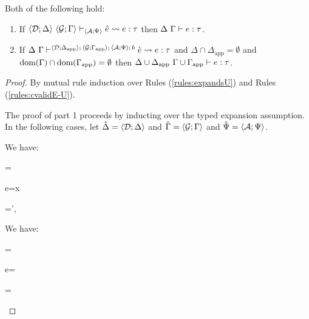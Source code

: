 \begin{theorem}\label{thm:typed-expansion-U} Both of the following hold:
\begin{enumerate}
\item If $\langle \mathcal{D}; \Delta \rangle~\langle \mathcal{G}; \Gamma \rangle \vdash_{\langle \mathcal{A}; \Psi \rangle} {\hat e} \leadsto e : \tau$ then $\Delta~\Gamma \vdash e : \tau$.
\item If $\Delta~\Gamma\vdash^{\langle \mathcal{D}; \Delta_\text{app} \rangle;\,\langle \mathcal{G}; \Gamma_\text{app} \rangle;\,\langle \mathcal{A}; \Psi \rangle;\,b} \grave{e} \leadsto e : \tau$ and $\Delta \cap \Delta_\text{app} = \emptyset$ and $\text{dom}(\Gamma) \cap \text{dom}(\Gamma_\text{app}) = \emptyset$ then ${\Delta}\cup{\Delta_\text{app}}~{\Gamma}\cup{\Gamma_\text{app}} \vdash e : \tau$.
\end{enumerate}
\end{theorem}
\begin{proof}
By mutual rule induction over Rules (\ref{rules:expandsU}) and Rules (\ref{rules:cvalidE-U}). 

The proof of part 1 proceeds by inducting over the typed expansion assumption. In the following cases, let $\hat{\Delta}=\langle \mathcal{D}; \Delta \rangle$ and $\hat{\Gamma}=\langle \mathcal{G}; \Gamma \rangle$ and $\hat{\Psi}=\langle \mathcal{A}; \Psi \rangle$.
\begin{byCases}
\item[\text{(\ref{rule:expandsU-var})}] We have:
\begin{pfsteps}
  \item \ue=\ux {}
  \item e=x 
  \item \Gamma=\Gamma',  
  \item {} 
\end{pfsteps}
\resetpfcounter

\item[\text{(\ref{rule:expandsU-lam})}] We have:
\begin{pfsteps}
  \item \ue= 
  \item e= 
  \item \tau= 
  \item {}  
  \item {}  
  \item {}  
  \item {}  
  \item {} 
\end{pfsteps}
\resetpfcounter


\end{byCases}
\end{proof}
